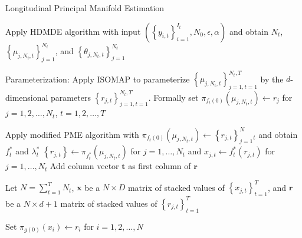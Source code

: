 \documentclass[11pt,reqno]{article}
\begin{document}
\begin{algorithm}
\caption{Longitudinal Principal Manifold Estimation}\label{alg:lpme}
 {
  Apply HDMDE algorithm with input $\left(\left\{y_{i, t}\right\}_{i = 1}^{I_t}, N_0, \epsilon, \alpha\right)$ and obtain $N_t$, $\left\{\mu_{j, N_t, t}\right\}_{j = 1}^{N_t}$, and $\left\{\theta_{j, N_t, t}\right\}_{j = 1}^{N_t}$\;
}

Parameterization: Apply ISOMAP to parameterize $\left\{\mu_{j, N_t, t}\right\}_{j = 1, t = 1}^{N_t, T}$ by the $d$-dimensional parameters $\left\{r_{j, t}\right\}_{j = 1, t = 1}^{N_t, T}$. Formally set $\pi_{f_t(0)}(\mu_{j, N_t, t}) \gets r_j$ for $j = 1, 2, \dots, N_t$, $t = 1, 2, \dots, T$\;

 {
  Apply modified PME algorithm with $\pi_{f_t(0)}(\mu_{j, N_t, t}) \gets \left\{r_{j, t}\right\}_{j = 1}^N_t$ and obtain $f_t^*$ and $\lambda_t^*$\;
  $\left\{r_{j, t}\right\} \gets \pi_{f_t^*}(\mu_{j, N_t, t})$ for $j = 1, \dots, N_t$ and $x_{j, t} \gets f_t^*(r_{j, t})$ for $j = 1, \dots, N_t$\;
  Add column vector $\mathbf{t}$ as first column of $\mathbf{r}$\;
}

Let $N = \sum_{t=1}^{T}N_t$, $\mathbf{x}$ be a $N \times D$ matrix of stacked values of $\left\{x_{j, t}\right\}_{t = 1}^T$, and $\mathbf{r}$ be a $N \times d + 1$ matrix of stacked values of $\left\{r_{j, t}\right\}_{t = 1}^T$ \;

Set $\pi_{g(0)}(x_i) \gets r_i$ for $i = 1, 2, \dots, N$\;


\end{algorithm}
\end{document}
